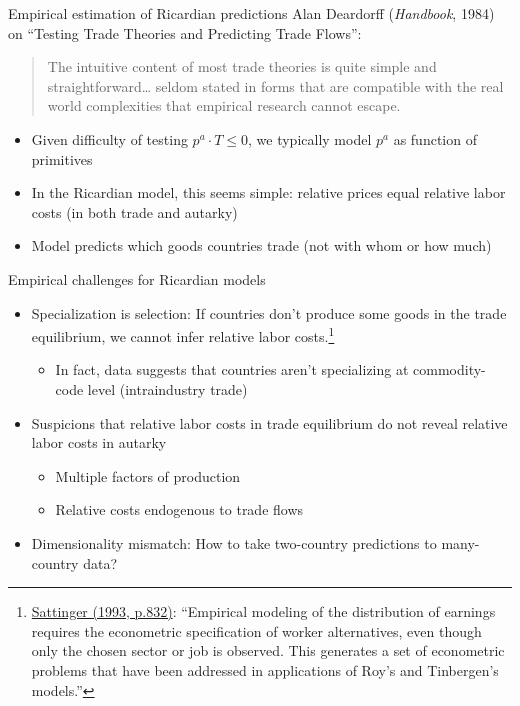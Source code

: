 \documentclass[10pt,notes=hide]{beamer}
\begin{document}
\begin{frame}{Empirical estimation of Ricardian predictions}
Alan Deardorff (\textit{Handbook}, 1984) on ``Testing Trade Theories and Predicting Trade Flows'':
\begin{quote}
The intuitive content of most trade theories is quite simple and straightforward\dots 
seldom stated in forms that are compatible with the real world complexities that empirical research cannot escape.
\end{quote}
\begin{itemize}
	\item Given difficulty of testing $p^a \cdot T \leq 0$,
	we typically model $p^a$ as function of primitives
	\item In the Ricardian model, this seems simple: 
	relative prices equal relative labor costs (in both trade and autarky)
	\item Model predicts which goods countries trade (not with whom or how much)
\end{itemize}
\end{frame}
\begin{frame}{Empirical challenges for Ricardian models}
\begin{itemize}
	\item Specialization is selection:
	If countries don't produce some goods in the trade equilibrium, 
	we cannot infer relative labor costs.\footnote{
		\href{https://www.jstor.org/stable/2728516}{Sattinger (1993, p.832)}: 
		``Empirical modeling of the distribution of earnings requires the econometric specification of worker alternatives, even though only the chosen sector or job is observed.
		This generates a set of econometric problems that have been addressed in applications of Roy's and Tinbergen's models.''
	}
	\begin{itemize}
		\item In fact, data suggests that countries aren't specializing at commodity-code level (intraindustry trade)
	\end{itemize}
	\item Suspicions that relative labor costs in trade equilibrium do not reveal relative labor costs in autarky
	\begin{itemize}
		\item Multiple factors of production
		\item Relative costs endogenous to trade flows
	\end{itemize}
	\item Dimensionality mismatch:
	How to take two-country predictions to many-country data?
\end{itemize}
\end{frame}
\end{document}
